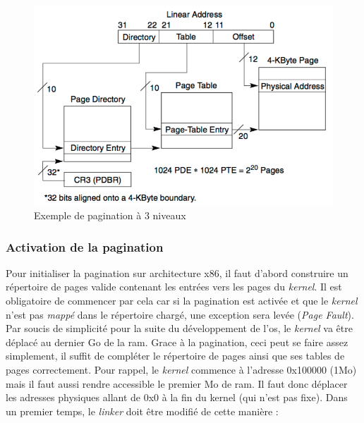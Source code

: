 \begin{figure}[!h]
  \centering
  \includegraphics[scale=0.85]{images/paging3.png}
  \caption{Exemple de pagination à 3 niveaux}
  \label{paging3}
\end{figure}


\subsubsection{Activation de la pagination}
\label{activate_paging}
Pour initialiser la pagination sur architecture x86, il faut d'abord construire
un répertoire de pages valide contenant les entrées vers les pages du \textit{kernel}.
Il est obligatoire de commencer par cela car si la pagination est activée et que
le \textit{kernel} n'est pas \textit{mappé} dans le répertoire chargé, une exception
sera levée (\textit{Page Fault}). Par soucis de simplicité pour la suite du développement
de l'\acrshort{os}, le \textit{kernel} va être déplacé au dernier Go de la \acrshort{ram}.
Grace à la pagination, ceci peut se faire assez simplement, il suffit de compléter
le répertoire de pages ainsi que ses tables de pages correctement. Pour rappel,
le \textit{kernel} commence à l'adresse 0x100000 (1Mo) mais il faut aussi rendre
accessible le premier Mo de \acrshort{ram}. Il faut donc déplacer les adresses physiques
allant de 0x0 à la fin du kernel (qui n'est pas fixe). Dans un premier temps, le
\textit{linker} doit être modifié de cette manière :


